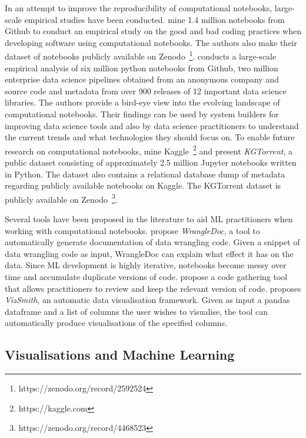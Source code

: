 \documentclass[acmsmall,screen,review,anonymous]{acmart}
\begin{document}
In an attempt to improve the reproducibility of computational notebooks, large-scale empirical studies have been conducted. \citeauthor{pimentel2019large} mine 1.4 million notebooks from Github to conduct an empirical study on the good and bad coding practices when developing software using computational notebooks. The authors also make their dataset of notebooks publicly available on Zenodo~\footnote{https://zenodo.org/record/2592524}. 
\citeauthor{psallidas2019data} conducts a large-scale empirical analysis of six million python notebooks from Github, two million enterprise data science pipelines obtained from an anonymous company and source code and metadata from over 900 releases of 12 important data science libraries. The authors provide a bird-eye view into the evolving landscape of computational notebooks. Their findings can be used by system builders for improving data science tools and also by data science practitioners to understand the current trends and what technologies they should focus on. To enable future research on computational notebooks, \citeauthor{quaranta2021kgtorrent} mine Kaggle~\footnote{https://kaggle.com} and present \textit{KGTorrent}, a public dataset consisting of approximately 2.5 million Jupyter notebooks written in Python. The dataset also contains a relational database dump of metadata regarding publicly available notebooks on Kaggle. The KGTorrent dataset is publicly available on Zenodo~\footnote{https://zenodo.org/record/4468523}.

Several tools have been proposed in the literature to aid ML practitioners when working with computational notebooks. \citeauthor{yang2021subtle} propose \textit{WrangleDoc}, a tool to automatically generate documentation of data wrangling code. Given a snippet of data wrangling code as input, WrangleDoc can explain what effect it has on the data. Since ML development is highly iterative, notebooks become messy over time and accumulate duplicate versions of code. \citeauthor{head2019managing} propose a code gathering tool that allows practitioners to review and keep the relevant version of code. \citeauthor{bavishi2021vizsmith} proposes \textit{VizSmith}, an automatic data visualisation framework. Given as input a pandas dataframe and a list of columns the user wishes to visualise, the tool can automatically produce visualisations of the specified columns.

\subsection{Visualisations and Machine Learning}\label{sec:visualisations}
\end{document}
